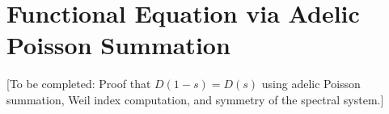 \section{Functional Equation via Adelic Poisson Summation}

[To be completed: Proof that $D(1-s) = D(s)$ using adelic Poisson summation, Weil index computation, and symmetry of the spectral system.]
